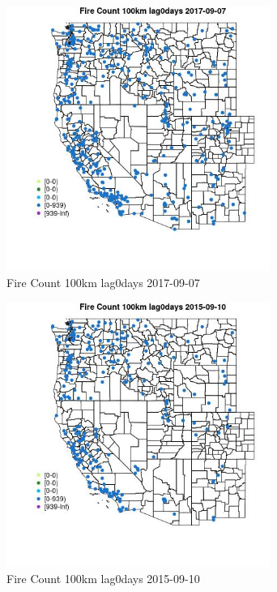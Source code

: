 \begin{figure} 
\centering  
\includegraphics[width=0.77\textwidth]{Code_Outputs/Report_ML_input_PM25_Step4_part_e_de_duplicated_aves_compiled_2019-05-21wNAs_MapObsFire_Count_100km_lag0days2017-09-07.jpg} 
\caption{\label{fig:Report_ML_input_PM25_Step4_part_e_de_duplicated_aves_compiled_2019-05-21wNAsMapObsFire_Count_100km_lag0days2017-09-07}Fire Count 100km lag0days 2017-09-07} 
\end{figure} 
 

\clearpage 

\begin{figure} 
\centering  
\includegraphics[width=0.77\textwidth]{Code_Outputs/Report_ML_input_PM25_Step4_part_e_de_duplicated_aves_compiled_2019-05-21wNAs_MapObsFire_Count_100km_lag0days2015-09-10.jpg} 
\caption{\label{fig:Report_ML_input_PM25_Step4_part_e_de_duplicated_aves_compiled_2019-05-21wNAsMapObsFire_Count_100km_lag0days2015-09-10}Fire Count 100km lag0days 2015-09-10} 
\end{figure} 
 

